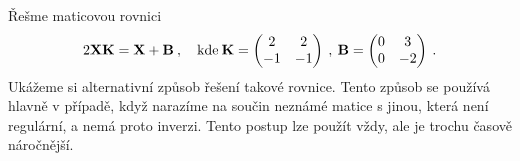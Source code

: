 \begin{example}
    Řešme maticovou rovnici \begin{align}
        2 \mathbf{X} \mathbf{K} = \mathbf{X} + \mathbf{B} \:, \quad \text{kde} \: 
        \mathbf{K} = \begin{pmatrix}
            2 & 2 \\ -1 & -1
        \end{pmatrix} \:,
        \:
        \mathbf{B} = \begin{pmatrix}
            0 & 3 \\ 0 & -2
        \end{pmatrix} \:.
    \end{align}
    Ukážeme si alternativní způsob řešení takové rovnice. Tento způsob se používá hlavně v případě, když narazíme na součin neznámé matice s jinou, která není regulární, a nemá proto inverzi. Tento postup lze použít vždy, ale je trochu časově náročnější.
    

\end{example}
